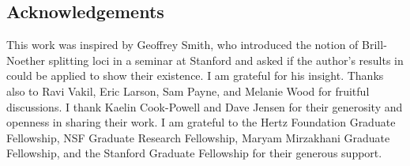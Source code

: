 \subsection*{Acknowledgements} This work was inspired by Geoffrey Smith, who introduced the notion of Brill-Noether splitting loci in a seminar at Stanford and asked if the author's results in \cite{L} could be applied to show their existence. I am grateful for his insight. Thanks also to Ravi Vakil, Eric Larson, Sam Payne, and Melanie Wood for fruitful discussions.  I thank Kaelin Cook-Powell and Dave Jensen for their generosity and openness in sharing their work. I am grateful to the Hertz Foundation Graduate Fellowship, NSF Graduate Research Fellowship, Maryam Mirzakhani Graduate Fellowship, and the Stanford Graduate Fellowship for their generous support.
